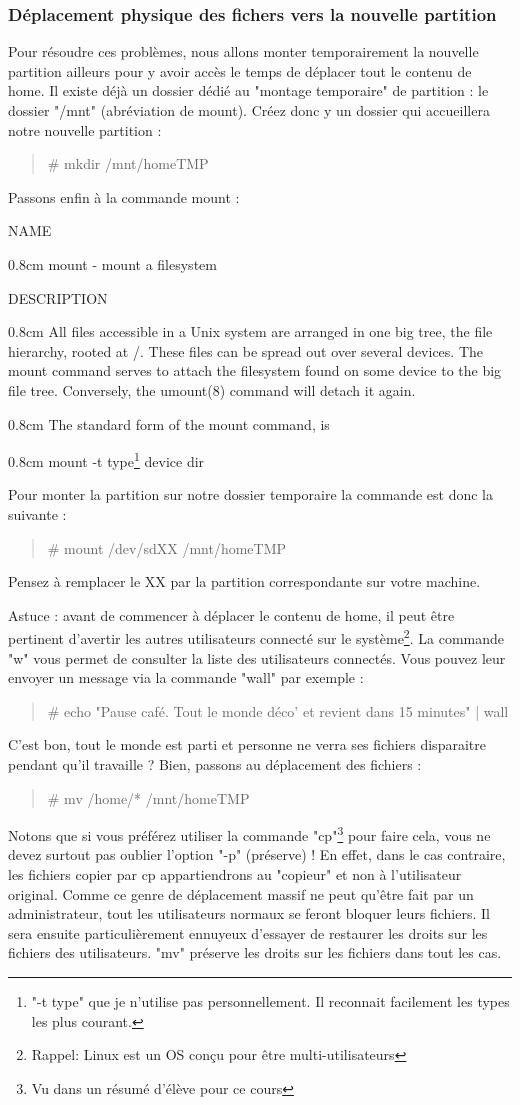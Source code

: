 \documentclass[a4paper,11pt]{article}
\newcommand{\commande}[1] {
    \begin{quote}
    \tt\raggedright #1 
    \end{quote}
}
\newcommand{\man}[2]{
    \begin{tcolorbox}[toprule=3mm,width=\textwidth,outer arc=0mm,colbacktitle=grayman,coltitle=black,colback={grayman},colframe={grayman},title={man : \tt #1}]
        \tt\raggedright #2
    \end{tcolorbox}
}
\newcommand{\mandesc}[1]{
    \begin{adjustwidth}{0.8cm}{}
        #1
    \end{adjustwidth}
}
\begin{document}
\subsubsection{Déplacement physique des fichers vers la nouvelle partition}
\par Pour résoudre ces problèmes, nous allons monter temporairement la nouvelle partition ailleurs pour y avoir accès le temps de déplacer tout le contenu de home. Il existe déjà un dossier dédié au "montage temporaire" de partition : le dossier "/mnt" (abréviation de mount). Créez donc y un dossier qui accueillera notre nouvelle partition :
\commande{\# mkdir /mnt/homeTMP}
\par Passons enfin à la commande mount :
\man{mount}{NAME
\mandesc{mount - mount a filesystem}
DESCRIPTION
\mandesc{All  files  accessible  in  a  Unix  system are arranged in one big tree, the file hierarchy, rooted at /.  These files can be spread out over several devices. The mount command serves to attach the filesystem found on some device to the big file tree. Conversely, the umount(8) command will detach it again.}
\mandesc{The standard form of the mount command, is
    \mandesc{mount -t type\footnote{"-t type" que je n'utilise pas personnellement. Il reconnait facilement les types les plus courant.} device dir}
}}
\par Pour monter la partition sur notre dossier temporaire la commande est donc la suivante :
\commande{\# mount /dev/sdXX /mnt/homeTMP}
\par Pensez à remplacer le XX par la partition correspondante sur votre machine.
\par Astuce : avant de commencer à déplacer le contenu de home, il peut être pertinent d'avertir les autres utilisateurs connecté sur le système\footnote{Rappel: Linux est un OS conçu pour être multi-utilisateurs}. La commande "w" vous permet de consulter la liste des utilisateurs connectés. Vous pouvez leur envoyer un message via la commande "wall" par exemple :
\commande{\# echo "Pause café. Tout le monde déco' et revient dans 15 minutes" | wall}
\par C'est bon, tout le monde est parti et personne ne verra ses fichiers disparaitre pendant qu'il travaille ? Bien, passons au déplacement des fichiers :
\commande{\# mv /home/* /mnt/homeTMP}
\par Notons que si vous préférez utiliser la commande "cp"\footnote{Vu dans un résumé d'élève pour ce cours} pour faire cela, vous ne devez surtout pas oublier l'option "-p" (préserve) ! En effet, dans le cas contraire, les fichiers copier par cp appartiendrons au "copieur" et non à l'utilisateur original. Comme ce genre de déplacement massif ne peut qu'être fait par un administrateur, tout les utilisateurs normaux se feront bloquer leurs fichiers. Il sera ensuite particulièrement ennuyeux d'essayer de restaurer les droits sur les fichiers des utilisateurs. "mv" préserve les droits sur les fichiers dans tout les cas.
\end{document}
